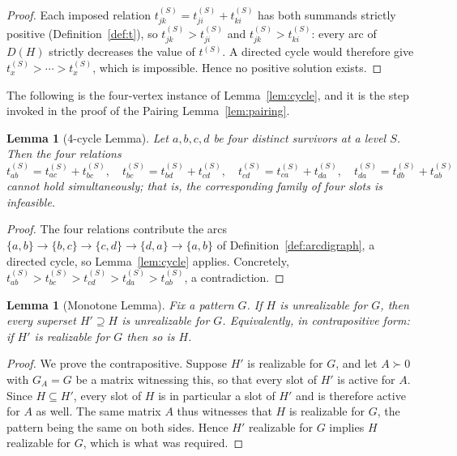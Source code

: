 \documentclass[11pt]{article}
\theoremstyle{plain}
\newtheorem{lemma}[theorem]{Lemma}
\theoremstyle{definition}
\theoremstyle{remark}
\begin{document}
\begin{humanaiblock}
\begin{proof}
Each imposed relation $t^{(S)}_{jk}=t^{(S)}_{ji}+t^{(S)}_{ki}$ has both summands strictly positive
(Definition~\ref{def:t}), so $t^{(S)}_{jk}>t^{(S)}_{ji}$ and $t^{(S)}_{jk}>t^{(S)}_{ki}$: every arc of
$D(H)$ strictly decreases the value of $t^{(S)}$. A directed cycle would therefore give
$t^{(S)}_x>\cdots>t^{(S)}_x$, which is impossible. Hence no positive solution exists.
\end{proof}

The following is the
four-vertex instance of Lemma~\ref{lem:cycle}, and it is the step invoked in the proof of the Pairing
Lemma~\ref{lem:pairing}.

\begin{lemma}[4-cycle Lemma]\label{lem:4cycle}
Let $a,b,c,d$ be four distinct survivors at a level $S$. Then the four relations
\[
t^{(S)}_{ab}=t^{(S)}_{ac}+t^{(S)}_{bc},\quad
t^{(S)}_{bc}=t^{(S)}_{bd}+t^{(S)}_{cd},\quad
t^{(S)}_{cd}=t^{(S)}_{ca}+t^{(S)}_{da},\quad
t^{(S)}_{da}=t^{(S)}_{db}+t^{(S)}_{ab}
\]
cannot hold simultaneously; that is, the corresponding family of four slots is infeasible.
\end{lemma}
\begin{proof}
The four relations contribute the arcs $\{a,b\}\to\{b,c\}\to\{c,d\}\to\{d,a\}\to\{a,b\}$ of
Definition~\ref{def:arcdigraph}, a directed cycle, so Lemma~\ref{lem:cycle} applies. Concretely,
$t^{(S)}_{ab}>t^{(S)}_{bc}>t^{(S)}_{cd}>t^{(S)}_{da}>t^{(S)}_{ab}$, a contradiction.
\end{proof}

\begin{lemma}[Monotone Lemma]\label{lem:monotone}
Fix a pattern $G$. If $H$ is unrealizable for $G$, then every superset $H'\supseteq H$ is unrealizable
for $G$. Equivalently, in contrapositive form: if $H'$ is realizable for $G$ then so is $H$.
\end{lemma}
\begin{proof}
We prove the contrapositive. Suppose $H'$ is realizable for $G$, and let $A\succ0$ with $G_A=G$ be a
matrix witnessing this, so that every slot of $H'$ is active for $A$. Since $H\subseteq H'$, every slot
of $H$ is in particular a slot of $H'$ and is therefore active for $A$ as well. The same matrix $A$
thus witnesses that $H$ is realizable for $G$, the pattern being the same on both sides. Hence $H'$
realizable for $G$ implies $H$ realizable for $G$, which is what was required.
\end{proof}
\end{humanaiblock}
\end{document}
